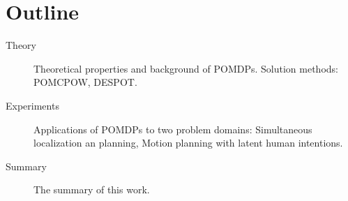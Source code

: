 \section{Outline}

\begin{description}
  \item[Theory] Theoretical properties and background of POMDPs. Solution methods: POMCPOW, DESPOT.
  \item[Experiments] Applications of POMDPs to two problem domains: Simultaneous localization an planning, Motion planning with latent human intentions.
  \item[Summary] The summary of this work.
\end{description}
